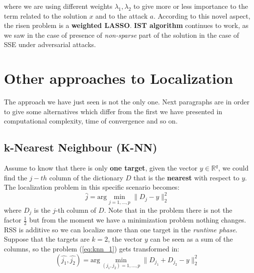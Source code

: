 \hspace*{-5mm}


where we are using different weights $\lambda_1, \lambda_2$ to give more or less importance to the term related to the solution $x$ and to the attack $a$. According to this novel aspect, the risen problem is a \textbf{weighted LASSO}. \textbf{IST algorithm} continues to work, as we saw in the case of presence of \textit{non-sparse} part of the solution in the case of SSE under adversarial attacks.

\noindent
\section{Other approaches to Localization}
The approach we have just seen is not the only one. Next paragraphs are in order to give some alternatives which differ from the first we have presented in computational complexity, time of convergence and so on.

\subsection{k-Nearest Neighbour (K-NN)}
Assume to know that there is only \textbf{one target}, given the vector $y\in \mathbb{R}^q$, we could find the $j-th$ column of the dictionary $D$ that is the \textbf{nearest} with respect to $y$. The localization problem in this specific scenario becomes: 
\begin{equation} \label{eq:knn_1}
	\hat{j} = \text{arg}\min_{j=1,...,p} \lVert D_j-y \rVert_2^2
\end{equation}
where $D_j$  is the $j$-th column of $D$. Note that in the problem there is not the factor $\frac{1}{2}$ but from the moment we have a minimization problem nothing changes.\\
RSS is additive so we can localize more than one target in the \textit{runtime phase}. Suppose that the targets are $k=2$, the vector $y$ can be seen as a sum of the columns, so the problem (\ref{eq:knn_1}) gets transformed in:
\begin{equation}
	(\hat{j_1}, \hat{j_2}) = \text{arg}\min_{(j_1, j_2)=1,...,p} 
	\lVert D_{j_1}+D_{j_2}-y \rVert_2^2
\end{equation} 

